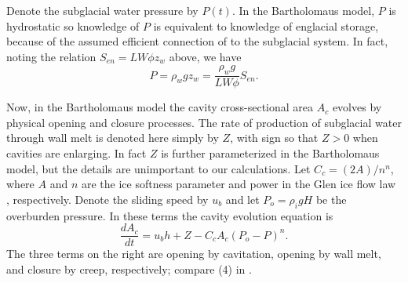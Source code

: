 \documentclass[review,letterpaper]{igs}
\begin{document}
Denote the subglacial water pressure by $P(t)$.  In the Bartholomaus model, $P$ is hydrostatic so knowledge of $P$ is equivalent to knowledge of englacial storage, because of the assumed efficient connection of to the subglacial system.  In fact, noting the relation $S_{en}=L W \phi z_w$ above, we have
\begin{equation}
P = \rho_w g z_w = \frac{\rho_w g}{LW\phi} S_{en}.  \label{eq:barth:englacialpressure}
\end{equation}

Now, in the Bartholomaus model the cavity cross-sectional area $A_c$ evolves by physical opening and closure processes.  The rate of production of subglacial water through wall melt is denoted here simply by $Z$, with sign so that $Z>0$ when cavities are enlarging.  In fact $Z$ is further parameterized in the Bartholomaus model, but the details are unimportant to our calculations.  Let $C_c = (2 A)/n^n$, where $A$ and $n$ are the ice softness parameter and power in the Glen ice flow law \citep{CuffeyPaterson}, respectively.  Denote the sliding speed by $u_b$ and let $P_o=\rho_i g H$ be the overburden pressure.  In these terms the cavity evolution equation is
\begin{equation}
\frac{dA_c}{dt} = u_b h + Z - C_c A_c (P_o-P)^n.  \label{eq:barth:cavityevolution}
\end{equation}
The three terms on the right are opening by cavitation, opening by wall melt, and closure by creep, respectively; compare (4) in \cite{Bartholomausetal2011}.
\end{document}
